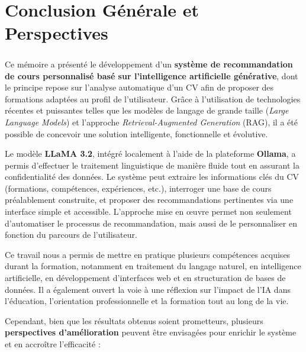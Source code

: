 \chapter*{Conclusion Générale et Perspectives}
\paragraph{}
Ce mémoire a présenté le développement d’un \textbf{système de recommandation de cours personnalisé basé sur l’intelligence artificielle générative}, dont le principe repose sur l’analyse automatique d’un CV afin de proposer des formations adaptées au profil de l’utilisateur. Grâce à l’utilisation de technologies récentes et puissantes telles que les modèles de langage de grande taille (\textit{Large Language Models}) et l’approche \textit{Retrieval-Augmented Generation} (RAG), il a été possible de concevoir une solution intelligente, fonctionnelle et évolutive.

Le modèle \textbf{LLaMA 3.2}, intégré localement à l’aide de la plateforme \textbf{Ollama}, a permis d’effectuer le traitement linguistique de manière fluide tout en assurant la confidentialité des données. Le système peut extraire les informations clés du CV (formations, compétences, expériences, etc.), interroger une base de cours préalablement construite, et proposer des recommandations pertinentes via une interface simple et accessible. L’approche mise en œuvre permet non seulement d'automatiser le processus de recommandation, mais aussi de le personnaliser en fonction du parcours de l'utilisateur.

Ce travail nous a permis de mettre en pratique plusieurs compétences acquises durant la formation, notamment en traitement du langage naturel, en intelligence artificielle, en développement d’interfaces web et en structuration de bases de données. Il a également ouvert la voie à une réflexion sur l’impact de l’IA dans l’éducation, l’orientation professionnelle et la formation tout au long de la vie.

\bigskip

Cependant, bien que les résultats obtenus soient prometteurs, plusieurs \textbf{perspectives d’amélioration} peuvent être envisagées pour enrichir le système et en accroître l’efficacité :

